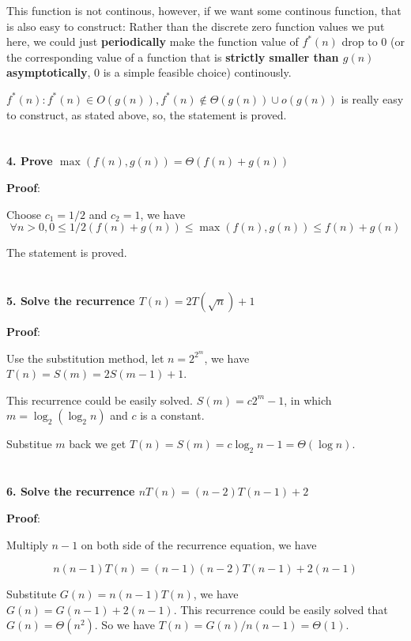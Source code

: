 \documentclass[paper=a4, fontsize=11pt]{scrartcl} %
\numberwithin{equation}{section} %
\numberwithin{figure}{section} %
\numberwithin{table}{section} %
\begin{document}
This function is not continous, however, if we want some continous function, that is also easy to construct: Rather than the discrete zero function values we put here, we could just \textbf{periodically} make the function value of $f^{*}(n)$ drop to 0 (or the corresponding value of a function that is \textbf{strictly smaller than $g(n)$ asymptotically}, 0 is a simple feasible choice) continously.

$f^{*}(n): f^{*}(n) \in O(g(n)), f^{*}(n) \notin \Theta(g(n)) \cup o(g(n))$ is really easy to construct, as stated above, so, the statement is proved.

\section{}
\textbf{4. Prove $\max(f(n), g(n)) = \Theta(f(n) + g(n))$}

\textbf{Proof}:

Choose $c_1 = 1/2$ and $c_2 = 1$, we have
\[
\forall n > 0, 0 \leq 1/2 (f(n) + g(n)) \leq \max(f(n), g(n)) \leq f(n) + g(n)
\]

The statement is proved.

\section{}
\textbf{5. Solve the recurrence $T(n) = 2T(\sqrt{n}) + 1$}

\textbf{Proof}:

Use the substitution method, let $n = 2^{2^m}$, we have $T(n) = S(m) = 2S(m-1) + 1$.

This recurrence could be easily solved. $S(m) = c2^m - 1$, in which $m = \log_2{(\log_2{n})}$ and $c$ is a constant.

Substitue $m$ back we get $T(n) = S(m) = c\log_2{n} - 1 = \Theta(\log{n})$.

\section{}
\textbf{6. Solve the recurrence $nT(n) = (n-2)T(n-1) + 2$}

\textbf{Proof}:

Multiply $n-1$ on both side of the recurrence equation, we have

\[
n(n-1)T(n) = (n-1)(n-2)T(n-1) + 2(n-1)
\]

Substitute $G(n) = n(n-1)T(n)$, we have $G(n) = G(n-1) + 2(n-1)$. This recurrence could be easily solved that $G(n) = \Theta(n^2)$. So we have $T(n) = G(n)/{n(n-1)} = \Theta(1)$.
\end{document}
